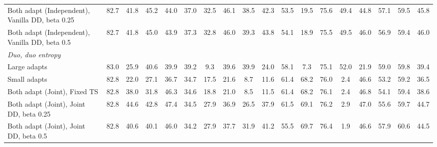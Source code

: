 \begin{table}[t]
{\begin{tabular}{l|c|ccc|cccc|cccc|cccc|c}
        \quad Both adapt (Independent), Vanilla DD, beta 0.25 & 82.7 & 41.8 & 45.2 & 44.0 & 37.0 & 32.5 & 46.1 & 38.5 & 42.3 & 53.5 & 19.5 & 75.6 & 49.4 & 44.8 & 57.1 & 59.5 & 45.8 \\
        \quad Both adapt (Independent), Vanilla DD, beta 0.5 & 82.7 & 41.8 & 45.0 & 43.9 & 37.3 & 32.8 & 46.0 & 39.3 & 43.8 & 54.1 & 18.9 & 75.5 & 49.5 & 46.0 & 56.9 & 59.4 & 46.0 \\
        \midrule
        \multicolumn{18}{l}{\textit{Duo, duo entropy}} \\
        \quad Large adapts & 83.0 & 25.9 & 40.6 & 39.9 & 39.2 & 9.3 & 39.6 & 39.9 & 24.0 & 58.1 & 7.3 & 75.1 & 52.0 & 21.9 & 59.0 & 59.8 & 39.4 \\
        \quad Small adapts & 82.8 & 22.0 & 27.1 & 36.7 & 34.7 & 17.5 & 21.6 & 8.7 & 11.6 & 61.4 & 68.2 & 76.0 & 2.4 & 46.6 & 53.2 & 59.2 & 36.5 \\
        \quad Both adapt (Joint), Fixed TS & 82.8 & 38.0 & 31.8 & 46.3 & 34.6 & 18.8 & 21.0 & 8.5 & 11.5 & 61.4 & 68.2 & 76.1 & 2.4 & 46.8 & 54.1 & 59.4 & 38.6 \\
        \quad Both adapt (Joint), Joint DD, beta 0.25 & 82.8 & 44.6 & 42.8 & 47.4 & 34.5 & 27.9 & 36.9 & 26.5 & 37.9 & 61.5 & 69.1 & 76.2 & 2.9 & 47.0 & 55.6 & 59.7 & 44.7 \\
        \quad Both adapt (Joint), Joint DD, beta 0.5 & 82.8 & 40.6 & 40.1 & 46.0 & 34.2 & 27.9 & 37.7 & 31.9 & 41.2 & 55.5 & 69.7 & 76.4 & 1.9 & 46.6 & 57.9 & 60.6 & 44.5 \\
        \bottomrule
    \end{tabular}%
    }
\end{table}
